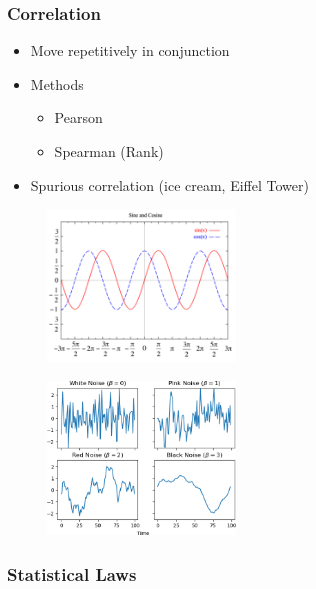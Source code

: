\begin{frame}\frametitle{Correlation}
   \begin{itemize}
      \item Move repetitively in conjunction
      \item Methods
      \begin{itemize}
         \item Pearson
         \item Spearman (Rank)
      \end{itemize}
      \item Spurious correlation (ice cream, Eiffel Tower)
   \end{itemize}
   \vspace{.5cm}
   \begin{minipage}{0.48\linewidth}
      \begin{figure}[H]
         \includegraphics[width=5cm]{../images/illustrations/correlation_conjunction.png}
      \end{figure}
   \end{minipage}
   \begin{minipage}{0.48\linewidth}
      \begin{figure}[H]
         \includegraphics[width=5cm]{../images/illustrations/correlation_noise.png}
      \end{figure}
   \end{minipage}
\end{frame}



\subsubsection{Statistical Laws}


